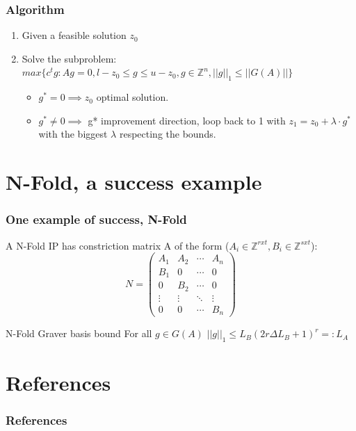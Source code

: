 \documentclass{beamer}
\begin{document}
    \begin{frame}
        \frametitle{Algorithm}
        \begin{enumerate}
            \item Given a feasible solution $z_0$
            \item Solve the subproblem:\\
                  $max\{c^tg : Ag = 0, l-z_0 \leq g \leq u-z_0, g \in \mathbb{Z}^n, ||g||_1 \leq ||G(A)|| \}$
            \begin{itemize}
                \item $g^* = 0 \implies z_0$ optimal solution.
                \item $g^* \neq 0 \implies$ g* improvement direction, loop back to 1 with $z_1 = z_0 + \lambda \cdot g^*$ with the biggest $\lambda$ respecting the bounds.
            \end{itemize}
        \end{enumerate}
    \end{frame}
    
    \section{N-Fold, a success example}
    \begin{frame}
        \frametitle{One example of success, N-Fold}
        
        A N-Fold IP has constriction matrix A of the form ($A_i \in \mathbb{Z}^{rxt}, B_i \in \mathbb{Z}^{sxt}$):\\
        \begin{equation*}
        N = 
        \begin{pmatrix}
        A_1 & A_2 & \cdots & A_n \\
        B_1 & 0   & \cdots & 0 \\
        0   & B_2 & \cdots & 0 \\
        \vdots    & \vdots & \ddots & \vdots  \\
        0   & 0   & \cdots & B_n 
        \end{pmatrix}
        \end{equation*}
        
        \begin{block}{N-Fold Graver basis bound}
            For all $g \in G(A)$ $||g||_1 \leq L_B (2r\Delta L_B + 1)^r =: L_A$ 
        \end{block}
        

    \end{frame}
    
    
    

    \section{References}
    \begin{frame}[allowframebreaks] %
        \frametitle{References}
        \nocite{*}
        \printbibliography
    \end{frame}
\end{document}
